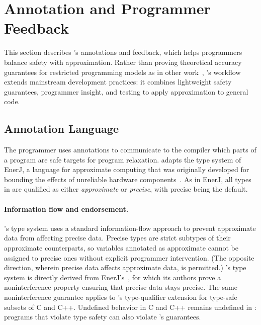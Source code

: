 \section{Annotation and Programmer Feedback}
\label{sec:annotation-feedback}

This section describes \sysname's annotations and feedback,
which helps programmers balance safety with approximation.
Rather than proving theoretical accuracy guarantees for restricted programming
models as in other work~\cite{sasa-sas11, zhu-popl12, passert},
\sysname's workflow extends mainstream development practices: it combines
lightweight safety guarantees, programmer insight, and testing to apply
approximation to general code.

\subsection{Annotation Language}
\label{sec:language}

The programmer uses annotations to communicate to the compiler which parts of
a program are safe targets for program relaxation.
\sysname adapts the type system of EnerJ, a language for approximate computing
that was originally developed for bounding the effects of unreliable hardware
components~\cite{enerj}.
As in EnerJ, all types in \sysname are qualified as either \emph{approximate} or
\emph{precise}, with precise being the default.

\paragraph{Information flow and endorsement.}
\sysname's type system uses a standard information-flow
approach to prevent approximate data from affecting precise data.
%
Precise types are strict subtypes of their approximate counterparts, so
variables annotated as approximate cannot be assigned to precise ones without
explicit programmer intervention.  (The opposite direction, wherein precise data
affects approximate data, is permitted.)
%
\sysname's type system is directly derived from EnerJ's~\cite{enerj}, for which
its authors prove a noninterference property ensuring that precise data stays
precise.  The same noninterference guarantee applies to \sysname's
type-qualifier extension for type-safe subsets of C and C++.
Undefined behavior in C and C++ remains undefined in \sysname:
programs that violate type safety can also violate \sysname's guarantees.


